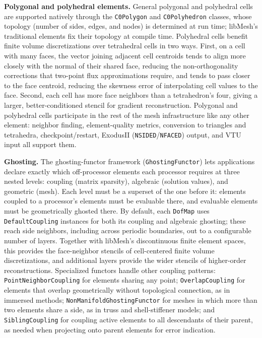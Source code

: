 \documentclass[preprint,12pt, a4paper]{elsarticle}
\begin{document}
\begin{enumerate}
\begin{enumerate}
\textbf{Polygonal and polyhedral elements.} General polygonal and polyhedral cells are supported
natively through the \texttt{C0Polygon} and \texttt{C0Polyhedron} classes, whose topology (number
of sides, edges, and nodes) is determined at run time; libMesh's traditional elements fix their
topology at compile time. Polyhedral cells benefit finite volume discretizations over tetrahedral cells in two ways.
First, on a cell with many faces, the vector joining adjacent cell centroids tends to align more
closely with the normal of their shared face, reducing the non-orthogonality corrections that
two-point flux approximations require, and tends to pass closer to the face centroid, reducing
the skewness error of interpolating cell values to the face. Second, each cell has more face
neighbors than a tetrahedron's four, giving a larger, better-conditioned stencil for gradient
reconstruction. Polygonal and polyhedral cells participate in the rest of the mesh infrastructure
like any other element: neighbor finding, element-quality metrics, conversion to triangles and
tetrahedra, checkpoint/restart, ExodusII (\texttt{NSIDED}/\texttt{NFACED}) output, and VTU input
all support them.

\textbf{Ghosting.} The ghosting-functor framework (\texttt{GhostingFunctor}) lets applications
declare exactly which off-processor elements each processor requires at three nested levels:
coupling (matrix sparsity), algebraic (solution values), and geometric (mesh). Each level must be a
superset of the one before it: elements coupled to a processor's elements must be evaluable there,
and evaluable elements must be geometrically ghosted there. By default, each \texttt{DofMap}
uses \texttt{DefaultCoupling} instances for both its coupling and algebraic ghosting; these reach
side neighbors, including across periodic boundaries, out to a configurable number of layers.
Together with libMesh's discontinuous finite element spaces, this provides the face-neighbor
stencils of cell-centered finite volume discretizations, and additional layers provide the wider
stencils of higher-order reconstructions.
Specialized functors handle other coupling patterns: \texttt{PointNeighborCoupling} for elements
sharing any point; \texttt{OverlapCoupling} for elements that overlap geometrically without
topological connection, as in immersed methods; \texttt{NonManifoldGhostingFunctor} for meshes in
which more than two elements share a side, as in truss and shell-stiffener models; and
\texttt{SiblingCoupling} for coupling active elements to all descendants of their parent, as
needed when projecting onto parent elements for error indication.


\end{enumerate}
\end{enumerate}
\end{document}
